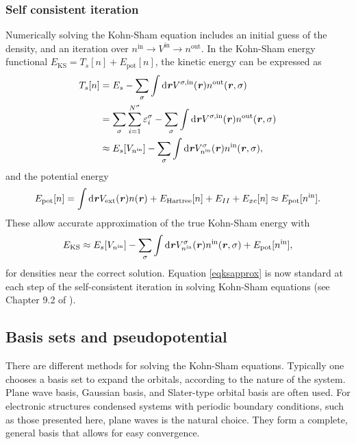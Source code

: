 \subsubsection{Self consistent iteration}
Numerically solving the Kohn-Sham equation includes an initial guess of the density,
and an iteration over $n^\text{in}\rightarrow V^\text{in}\rightarrow n^\text{out}$.
In the Kohn-Sham energy functional $E_\text{KS}=T_s[n]+E_\text{pot}[n]$, the kinetic
energy can be expressed as
%
\begin{equation}
\begin{aligned}
T_s[n] & =E_s-\sum_\sigma\int \mathrm{d}\textbf{\textit{r}} V^{\sigma,\text{in}}(\textbf{\textit{r}})n^\text{out}(\textbf{\textit{r}},\sigma) \\
 & =\sum_\sigma\sum_{i=1}^{N^\sigma}\varepsilon_i^\sigma-\sum_\sigma\int \mathrm{d}\textbf{\textit{r}} V^{\sigma,\text{in}}(\textbf{\textit{r}})n^\text{out}(\textbf{\textit{r}},\sigma) \\
& \approx E_s[V_{n^\text{in}}]-\sum_\sigma\int \mathrm{d}\textbf{\textit{r}} V^{\sigma}_{n^\text{in}}(\textbf{\textit{r}})n^\text{in}(\textbf{\textit{r}},\sigma), \label{eqtshwf}
\end{aligned}
\end{equation}
and the potential energy
\begin{equation}
E_\text{pot}[n]=\int \mathrm{d}\textbf{\textit{r}} V_\text{ext}(\textbf{\textit{r}})n(\textbf{\textit{r}})+E_\text{Hartree}[n]+E_{II}+E_{xc}[n]\approx E_\text{pot}[n^\text{in}]. \label{eqpot}
\end{equation}
These allow accurate approximation of the true Kohn-Sham energy with 
\begin{equation}
 E_\text{KS} \approx E_s[V_{n^\text{in}}]-\sum_\sigma\int \mathrm{d}\textbf{\textit{r}} V^{\sigma}_{n^\text{in}}(\textbf{\textit{r}})n^\text{in}(\textbf{\textit{r}},\sigma)+E_\text{pot}[n^\text{in}] \label{eqksapprox},
\end{equation}
for densities near the correct solution. Equation \ref{eqksapprox} is now standard at each step of the self-consistent iteration in solving Kohn-Sham equations (see Chapter 9.2 of \cite{martin-esbook}).

\subsection{Basis sets and pseudopotential}
There are different methods for solving the Kohn-Sham equations. Typically one
chooses a basis set to expand the orbitals, according to the nature of the system.
Plane wave basis, Gaussian basis, and Slater-type orbital basis are often used.  For
electronic structures condensed systems with periodic boundary conditions, such as
those presented here, plane waves is the  natural choice.  They form a complete,
general basis that allows for easy convergence.

